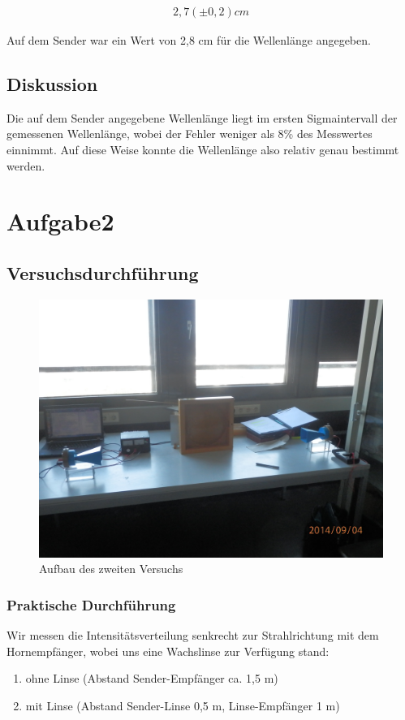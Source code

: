 \documentclass[12pt]{scrartcl}
\begin{document}
\begin{align*}
2,7 (\pm 0,2) cm
\end{align*}

Auf dem Sender war ein Wert von 2,8 cm für die Wellenlänge angegeben.
\subsection{Diskussion}
Die auf dem Sender angegebene Wellenlänge liegt im ersten Sigmaintervall der gemessenen Wellenlänge, wobei der Fehler weniger als 8\% des Messwertes einnimmt. Auf diese Weise konnte die Wellenlänge also relativ genau bestimmt werden.
\section{Aufgabe2}
\subsection{Versuchsdurchführung}
\begin{figure}[H] 
  \centering
    \includegraphics[scale = 0.1]{a_2.JPG}
  	\caption[Aufbau des zweiten Versuchs]{Aufbau des zweiten Versuchs}
  \label{fig:a_2}
\end{figure}
\subsubsection{Praktische Durchführung}
Wir messen die Intensitätsverteilung senkrecht zur Strahlrichtung mit dem Hornempfänger, wobei uns eine Wachslinse zur Verfügung stand:
\begin{enumerate}
\item ohne Linse (Abstand Sender-Empfänger ca. 1,5 m)
\item mit Linse (Abstand Sender-Linse 0,5 m, Linse-Empfänger 1 m)
\end{enumerate}
\end{document}

